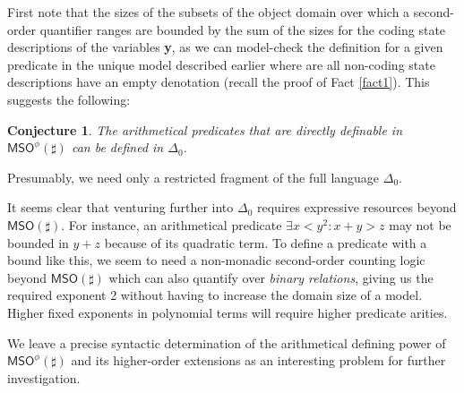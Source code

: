 \documentclass[12pt,oneside,reqno]{amsart}
\newtheorem{conjecture}{Conjecture}
\theoremstyle{definition}
\begin{document}
First note that the sizes of the subsets of the object domain over which a second-order quantifier ranges are bounded by the sum of the sizes for the coding state descriptions of the variables \textbf{y}, as we can model-check the definition for a given predicate in the unique model described earlier where are all non-coding state descriptions have an empty denotation (recall the proof of Fact \ref{fact1}). This suggests the following:

\begin{conjecture} The arithmetical predicates that are directly definable in $\mathsf{MSO}^\phi(\sharp)$ can be defined in $\Delta_0$.  \end{conjecture}

Presumably, we need only a restricted fragment of the full language $\Delta_0$.

It seems clear that venturing further into $\Delta_0$ requires expressive resources beyond $\mathsf{MSO}(\sharp)$. For instance, an arithmetical predicate $\exists x < y^{2}: x + y > z$ may not be bounded in $y + z$ because of its quadratic term. To define a predicate with a bound like this, we seem to need a non-monadic second-order counting logic beyond $\mathsf{MSO}(\sharp)$ which can also quantify over \emph{binary relations}, giving us the required exponent 2 without having to increase the domain size of a model. Higher fixed exponents in polynomial terms will require  higher predicate arities.


We leave a precise syntactic determination of the arithmetical defining power of $\mathsf{MSO}^\phi(\sharp)$ and its higher-order extensions as an interesting problem for further investigation.
\end{document}
